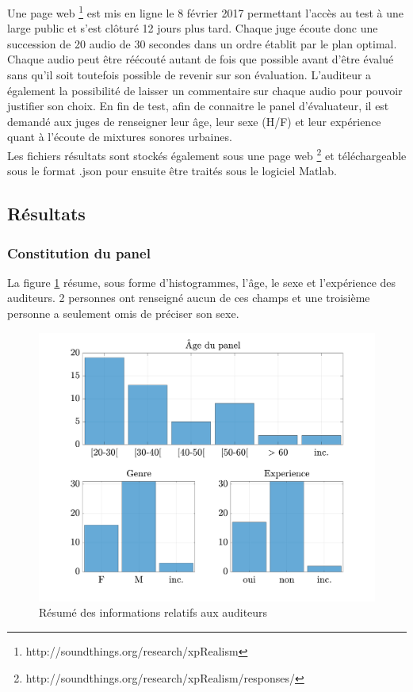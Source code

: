Une page web \footnote{http://soundthings.org/research/xpRealism} est mis en ligne le 8 février 2017 permettant l'accès au test à une large public et s'est clôturé 12 jours plus tard. Chaque juge écoute donc une succession de 20 audio de 30 secondes dans un ordre établit par le plan optimal. Chaque audio peut être réécouté autant de fois que possible avant d'être évalué sans qu'il soit toutefois possible de revenir sur son évaluation. L'auditeur a également la possibilité de laisser un commentaire sur chaque audio pour pouvoir justifier son choix. En fin de test, afin de connaitre le panel d'évaluateur, il est demandé aux juges de renseigner leur âge, leur sexe (H/F) et leur expérience quant à l'écoute de mixtures sonores urbaines.\\

Les fichiers résultats sont stockés également sous une page web \footnote{http://soundthings.org/research/xpRealism/responses/} et téléchargeable sous le format .json pour ensuite être traités sous le logiciel Matlab.\\

\subsection{Résultats}
\subsubsection{Constitution du panel}

La figure \ref{fig:panelTest} résume, sous forme d'histogrammes, l'âge, le sexe et l'expérience des auditeurs. 2 personnes ont renseigné aucun de ces champs et une troisième personne a seulement omis de préciser son sexe.\\

\begin{figure}[ht]
\centering
\includegraphics[width = .8\textwidth]{./figures/test_perceptif/testPerceptif_panel.pdf}
\caption{Résumé des informations relatifs aux auditeurs}
\label{fig:panelTest}
\end{figure}

